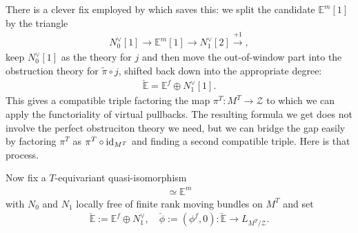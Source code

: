There is a clever fix employed by \cite{chang-kiem-li_TorusLocalizationWall2017} which saves this: we split the candidate \(\mathbb E^m[1]\) by the triangle
\begin{align*}
  N^\vee_0[1] \to \mathbb E^m[1] \to N^\vee_1[2] \xrightarrow{+1},
\end{align*}
keep \(N^\vee_0[1]\) as the theory for \(j\) and then move the out-of-window part into the obstruction theory for \(\widetilde \pi \circ j\), shifted back down into the appropriate degree:
\begin{align*}
  \check{\mathbb E} = \mathbb E^f\oplus N^\vee_1[1].
\end{align*}
This gives a compatible triple factoring the map \(\pi^T:M^T\to \mathcal Z\) to which we can apply the functoriality of virtual pullbacks. The resulting formula we get does not involve the perfect obstruciton theory we need, but we can bridge the gap easily by factoring \(\pi^T\) as \(\pi^T\circ \operatorname{id}_{M^T}\) and finding a second compatible triple. Here is that process.



Now fix a $T$-equivariant quasi-isomorphism
\begin{align*}
  [N^\vee_1\xrightarrow{d^\vee} N^\vee_0] \simeq \mathbb E^m \tag{degrees -1, 0}
\end{align*}
with \(N_0\) and \(N_1\) locally free of finite rank moving bundles on \(M^T\) and set
\begin{align*}
  \check{\mathbb E} := \mathbb E^f\oplus N^\vee_1, \quad \check \phi:= (\phi^f, 0):\check{\mathbb E} \to L_{M^T/\mathcal Z}.
\end{align*}





\newpage
